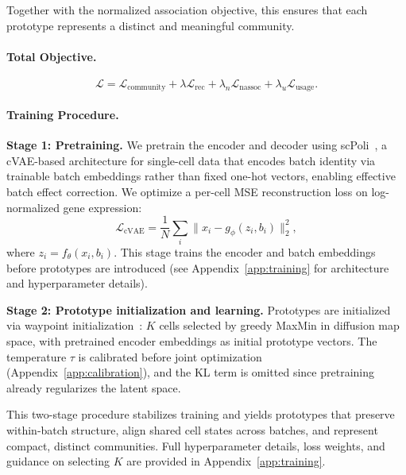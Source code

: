Together with the normalized association objective, this ensures that each prototype represents a distinct and meaningful community.

\paragraph{Total Objective.}
\[
\mathcal{L} =
\mathcal{L}_{\text{community}}
+
\lambda \mathcal{L}_{\text{rec}}
+
\lambda_n \mathcal{L}_{\text{nassoc}}
+
\lambda_u \mathcal{L}_{\text{usage}}.
\]

\paragraph{Training Procedure.}

\textbf{Stage 1: Pretraining.}
We pretrain the encoder and decoder using scPoli~\citep{scpoli}, a cVAE-based architecture for single-cell data that encodes batch identity via trainable batch embeddings rather than fixed one-hot vectors, enabling effective batch effect correction.
We optimize a per-cell MSE reconstruction loss on log-normalized gene expression:
\[
\mathcal{L}_{\text{cVAE}} =
\frac{1}{N}\sum_i \|x_i - g_\phi(z_i, b_i)\|_2^2,
\]
where $z_i = f_\theta(x_i, b_i)$. This stage trains the encoder and batch embeddings before prototypes are introduced (see Appendix~\ref{app:training} for architecture and hyperparameter details).

\textbf{Stage 2: Prototype initialization and learning.}
Prototypes are initialized via waypoint initialization~\citep{seacells}: $K$ cells selected by greedy MaxMin in diffusion map space, with pretrained encoder embeddings as initial prototype vectors. The temperature $\tau$ is calibrated before joint optimization (Appendix~\ref{app:calibration}), and the KL term is omitted since pretraining already regularizes the latent space.

This two-stage procedure stabilizes training and yields prototypes that preserve within-batch structure, align shared cell states across batches, and represent compact, distinct communities.
Full hyperparameter details, loss weights, and guidance on selecting $K$ are provided in Appendix~\ref{app:training}.